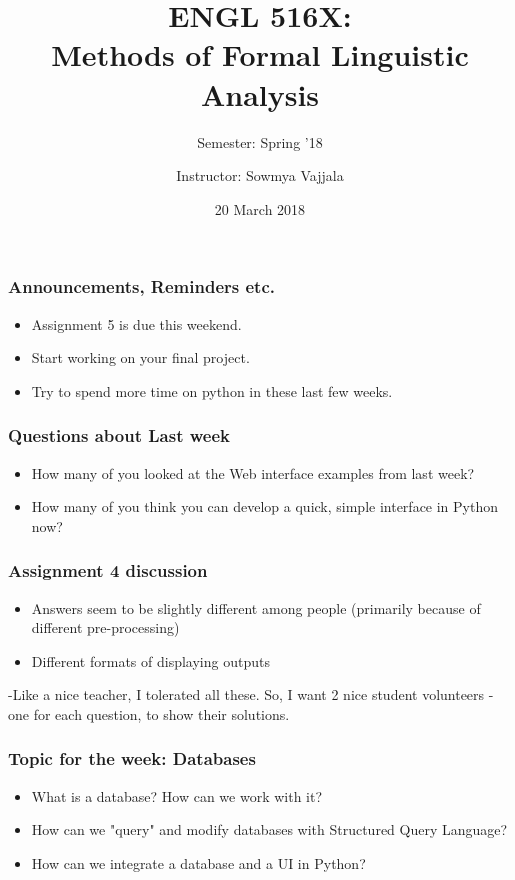 \documentclass{beamer}
\author[Sowmya Vajjala]{Instructor: Sowmya Vajjala}
\title[ENGL 516X]{ENGL 516X: \\ Methods of Formal Linguistic Analysis}
\subtitle{Semester: Spring '18}
\date{20 March 2018}
\institute{Iowa State University, USA}
\begin{document}
\begin{frame}\titlepage
\end{frame}

\begin{frame}
\frametitle{Announcements, Reminders etc.}
\begin{itemize}
\item Assignment 5 is due this weekend. 
\item Start working on your final project.
\item Try to spend more time on python in these last few weeks.
\end{itemize}
\end{frame}

\begin{frame}
\frametitle{Questions about Last week}
\begin{itemize}
\item How many of you looked at the Web interface examples from last week? \pause
\item How many of you think you can develop a quick, simple interface in Python now? \pause
\end{itemize}
\end{frame}

\begin{frame}
\frametitle{Assignment 4 discussion}
\begin{itemize}
\item Answers seem to be slightly different among people (primarily because of different pre-processing)
\item Different formats of displaying outputs
\end{itemize}
-Like a nice teacher, I tolerated all these. So, I want 2 nice student volunteers - one for each question, to show their solutions.
\end{frame}

\begin{frame}
\frametitle{Topic for the week: Databases}
\begin{itemize}
\item What is a database? How can we work with it?
\item How can we "query" and modify databases with Structured Query Language?
\item How can we integrate a database and a UI in Python?
\end{itemize}
\end{frame}
\end{document}

